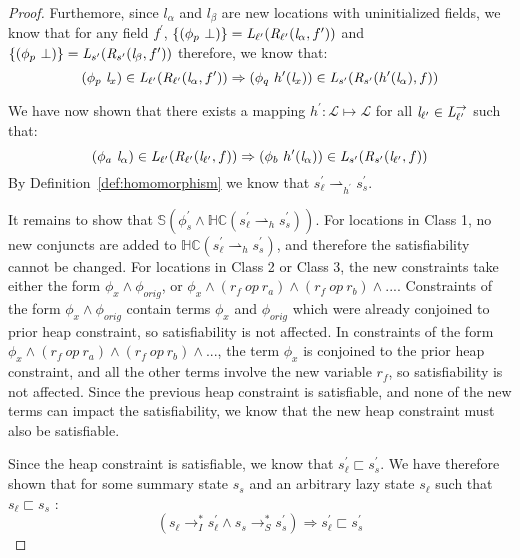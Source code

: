 \begin{proof}
Furthemore, since $l_\alpha$ and $l_\beta$ are new locations with uninitialized fields, we know that for any field $f^\prime$, $\{(\phi_p\ \bot)\} = \emph{L}_{\ell^\prime}(\emph{R}_{\ell^\prime} (\emph{l}_\alpha,f^\prime ))$ and $ \{(\phi_p\ \bot)\} = \emph{L}_{s^\prime}(\emph{R}_{s^\prime} (\emph{l}_\beta,f^\prime ))$ therefore, we know that:
$$(\phi_p\ \emph{l}_x) \in \emph{L}_{\ell^\prime}(\emph{R}_{\ell^\prime} (\emph{l}_\alpha,f^\prime )) \Rightarrow (\phi_q\ h^\prime (\emph{l}_x))\in \emph{L}_{s^\prime}(\emph{R}_{s^\prime} ( h^\prime(\emph{l}_\alpha),f ))$$

We have now shown that there exists a mapping $h^\prime: \mathcal{L} \mapsto \mathcal{L}$ for all $\emph{l}_{\ell^\prime} \in \emph{L}_{\ell^\prime}^\rightarrow$ such that:
$$ (\phi_a\ \emph{l}_\alpha) \in \emph{L}_{\ell^\prime}(\emph{R}_{\ell^\prime} (\emph{l}_{\ell^\prime},f )) \Rightarrow (\phi_b\ h^\prime (\emph{l}_\alpha))\in \emph{L}_{s^\prime}(\emph{R}_{s^\prime} (\emph{l}_{\ell^\prime},f )) $$
By Definition~\ref{def:homomorphism} we know that $s_\ell^\prime \rightharpoonup_{h^\prime} s_s^\prime$. 

It remains to show that $\mathbb{S}( \phi_s^\prime \wedge \mathbb{HC}(s_\ell^\prime \rightharpoonup_{h} s_s^\prime) )$. For locations in Class 1, no new conjuncts are added to $\mathbb{HC}(s_\ell^\prime \rightharpoonup_{h} s_s^\prime)$, and therefore the satisfiability cannot be changed. For locations in Class 2 or Class 3, the new constraints take either the form $\phi_x \wedge \phi_{orig}$, or $\phi_x \wedge (r_f\ op\ r_{a}) \wedge (r_f\ op\ r_{b}) \wedge ...$. Constraints of the form  $\phi_x \wedge \phi_{orig}$ contain terms $\phi_x$ and $\phi_{orig}$ which were already conjoined to prior heap constraint, so satisfiability is not affected. In constraints of the form $\phi_x \wedge (r_f\ op\ r_{a}) \wedge (r_f\ op\ r_{b}) \wedge ...$, the term $\phi_x$ is conjoined to the prior heap constraint, and all the other terms involve the new variable $r_f$, so satisfiability is not affected. Since the previous heap constraint is satisfiable, and none of the new terms can impact the satisfiability, we know that the new heap constraint must also be satisfiable.

Since the heap constraint is satisfiable, we know that $s_\ell^\prime \sqsubset s_s^\prime $. We have therefore shown that for some summary state $s_s$ and an arbitrary lazy state $s_\ell$ such that $s_\ell \sqsubset s_s$ :
\begin{equation} 
(s_\ell \rightarrow_I^* s_\ell^\prime \wedge s_s \rightarrow_S^* s_s^\prime) \Rightarrow s_\ell^\prime \sqsubset s_s^\prime 
\end{equation}



\end{proof}
